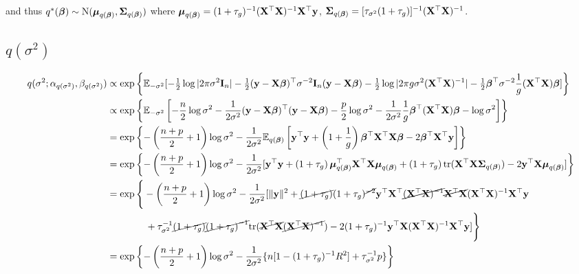 \documentclass{amsart}[12pt]
\theoremstyle{definition}
\begin{document}
and thus
$q^*({\boldsymbol \beta}) \sim \text{N} ({\boldsymbol \mu}_{q({\boldsymbol \beta})}, {\boldsymbol \Sigma}_{q({\boldsymbol \beta})} )$
where ${\boldsymbol \mu}_{q({\boldsymbol \beta})} = (1 + \tau_g)^{-1} ({\bf X}^\top {\bf X})^{-1} {\bf X}^\top {\bf y}$,
${\boldsymbol \Sigma}_{q({\boldsymbol \beta})} = [\tau_{\sigma^2}(1 + \tau_{g})]^{-1}({\bf X}^\top {\bf X})^{-1}$.

\small
\subsection{$q(\sigma^2)$}
\begin{align*}
	q(\sigma^2; \alpha_{q(\sigma^2)}, \beta_{q(\sigma^2)}) & \propto \exp \left \{ \mathbb{E}_{-\sigma^2} [-\tfrac{1}{2} \log |2 \pi \sigma^2 {\bf I}_n| - \tfrac{1}{2} ({\bf y} - {\bf X} {\boldsymbol \beta})^\top \sigma^{-2} {\bf I}_n ({\bf y} - {\bf X} {\boldsymbol \beta}) - \tfrac{1}{2} \log |2 \pi g \sigma^2 ({\bf X}^\top {\bf X})^{-1}| - \tfrac{1}{2} {\boldsymbol \beta}^\top \sigma^{-2} \frac{1}{g} ({\bf X}^\top {\bf X}) {\boldsymbol \beta}] \right \}                        \\
	                                                       & \propto  \exp \left \{ \mathbb{E}_{-\sigma^2} \left[- \frac{n}{2} \log \sigma^2 - \frac{1}{2 \sigma^2}({\bf y} - {\bf X} {\boldsymbol \beta})^\top({\bf y} - {\bf X} {\boldsymbol \beta}) - \frac{p}{2} \log \sigma^2 - \frac{1}{2 \sigma^2} \frac{1}{g} {\boldsymbol \beta}^\top ({\bf X}^\top {\bf X}) {\boldsymbol \beta} - \log \sigma^2\right] \right \}                             \\
	                                                       & =  \exp \left \{ {-\left(\frac{n + p}{2} + 1\right) \log \sigma^2 - \frac{1}{2 \sigma^2} \mathbb{E}_{q({\boldsymbol \beta})} \left[ {\bf y}^\top {\bf y} + \left(1 + \frac{1}{g} \right) {\boldsymbol \beta}^\top {\bf X}^\top {\bf X} {\boldsymbol\beta} - 2 {\boldsymbol \beta}^\top {\bf X}^\top {\bf y} \right]}  \right \}                                                          \\
	                                                       & =  \exp \left \{ -\left(\frac{n + p}{2} + 1 \right)\log \sigma^2  - \frac{1}{2 \sigma^2} [{\bf y}^\top{\bf y} + \left( 1 + \tau_g \right) {\boldsymbol \mu}_{q({\boldsymbol \beta})}^\top {\bf X}^\top {\bf X} {\boldsymbol\mu}_{q({\boldsymbol \beta})} + \left( 1 + \tau_g \right) \text{tr}({\bf X}^\top {\bf X} {\boldsymbol\Sigma}_{q({\boldsymbol \beta})}) - 2 {\bf y}^\top {\bf X} {\boldsymbol\mu}_{q({\boldsymbol \beta})} ] \right \} \\
	                                                       & =  \exp \Bigg \{ -\left(\frac{n + p}{2} + 1 \right)\log \sigma^2  - \frac{1}{2 \sigma^2} [\|{\bf y}\|^2 + \cancel{\left( 1 + \tau_g \right)} (1 + \tau_g)^{\cancel{-2}} {\bf y}^\top {\bf X}^\top \cancel{({\bf X}^\top {\bf X})^{-1}} \cancel{{\bf X}^\top {\bf X}} ({\bf X}^\top {\bf X})^{-1} {\bf X}^\top {\bf y}                             \\
	                                                       & \quad \quad \quad \quad + \tau_{\sigma^2}^{-1} \cancel{\left( 1 + \tau_g \right)} \cancel{\left( 1 + \tau_g \right)^{-1}} \text{tr}(\cancel{{\bf X}^\top {\bf X}} \cancel{({\bf X}^\top {\bf X})^{-1}}) - 2 (1 + \tau_g)^{-1} {\bf y}^\top {\bf X} ({\bf X}^\top {\bf X})^{-1} {\bf X}^\top {\bf y} ] \Bigg \}                                      \\
	                                                       & = \exp \left \{ -\left(\frac{n + p}{2} + 1 \right)\log \sigma^2 - \frac{1}{2 \sigma^2} \{n[1 - (1 + \tau_g)^{-1}  R^2] + \tau_{\sigma^2}^{-1} p \} \right \}                                                                                                                                          
\end{align*}
\end{document}
